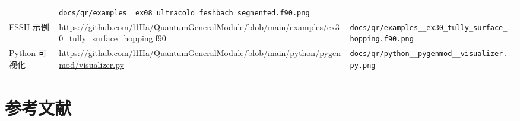 \documentclass[
  a4paper,
]{ctexbook}
\begin{document}
\begin{longtable}[]{@{}lll@{}}
\begin{minipage}[t]{0.30\columnwidth}
\end{minipage} & \begin{minipage}[t]{0.30\columnwidth}\raggedright
\texttt{docs/qr/examples\_\_ex08\_ultracold\_feshbach\_segmented.f90.png}\strut
\end{minipage}\tabularnewline
\begin{minipage}[t]{0.30\columnwidth}\raggedright
FSSH 示例\strut
\end{minipage} & \begin{minipage}[t]{0.30\columnwidth}\raggedright
\url{https://github.com/l1Ha/QuantumGeneralModule/blob/main/examples/ex30_tully_surface_hopping.f90}\strut
\end{minipage} & \begin{minipage}[t]{0.30\columnwidth}\raggedright
\texttt{docs/qr/examples\_\_ex30\_tully\_surface\_hopping.f90.png}\strut
\end{minipage}\tabularnewline
\begin{minipage}[t]{0.30\columnwidth}\raggedright
Python 可视化\strut
\end{minipage} & \begin{minipage}[t]{0.30\columnwidth}\raggedright
\url{https://github.com/l1Ha/QuantumGeneralModule/blob/main/python/pygenmod/visualizer.py}\strut
\end{minipage} & \begin{minipage}[t]{0.30\columnwidth}\raggedright
\texttt{docs/qr/python\_\_pygenmod\_\_visualizer.py.png}\strut
\end{minipage}\tabularnewline
\bottomrule
\end{longtable}

\hypertarget{ux53c2ux8003ux6587ux732e}{%
\section{参考文献}\label{ux53c2ux8003ux6587ux732e}}
\end{document}
